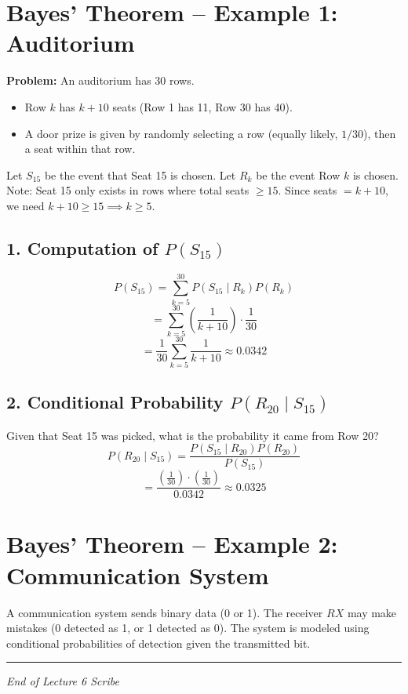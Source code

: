 \documentclass[11pt]{article}
\begin{document}
\section{Bayes’ Theorem – Example 1: Auditorium}
\textbf{Problem:} An auditorium has 30 rows.
\begin{itemize}
    \item Row $k$ has $k+10$ seats (Row 1 has 11, Row 30 has 40).
    \item A door prize is given by randomly selecting a row (equally likely, $1/30$), then a seat within that row.
\end{itemize}
Let $S_{15}$ be the event that Seat 15 is chosen. Let $R_k$ be the event Row $k$ is chosen.
Note: Seat 15 only exists in rows where total seats $\ge 15$. Since seats $= k+10$, we need $k+10 \ge 15 \implies k \ge 5$.

\subsection*{1. Computation of $P(S_{15})$}
\[ P(S_{15}) = \sum_{k=5}^{30} P(S_{15} \mid R_k) P(R_k) \]
\[ = \sum_{k=5}^{30} \left( \frac{1}{k+10} \right) \cdot \frac{1}{30} \]
\[ = \frac{1}{30} \sum_{k=5}^{30} \frac{1}{k+10} \approx 0.0342 \]

\subsection*{2. Conditional Probability $P(R_{20} \mid S_{15})$}
Given that Seat 15 was picked, what is the probability it came from Row 20?
\[ P(R_{20} \mid S_{15}) = \frac{P(S_{15} \mid R_{20})P(R_{20})}{P(S_{15})} \]
\[ = \frac{\left(\frac{1}{30}\right) \cdot \left(\frac{1}{30}\right)}{0.0342} \approx 0.0325 \]

\section{Bayes’ Theorem – Example 2: Communication System}
A communication system sends binary data (0 or 1). The receiver $RX$ may make mistakes (0 detected as 1, or 1 detected as 0). The system is modeled using conditional probabilities of detection given the transmitted bit.

\bigskip
\hrule
\vspace{0.2cm}
\begin{center}
    \small \textit{End of Lecture 6 Scribe}
\end{center}
\end{document}

